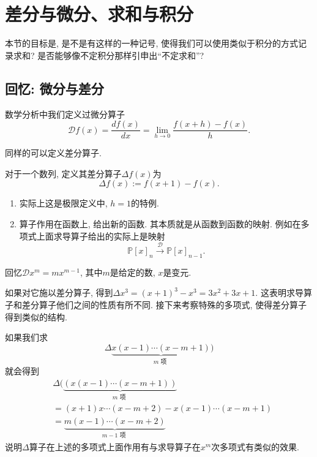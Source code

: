 \documentclass{ctexart}
\begin{document}
\newpage
\section{差分与微分、求和与积分}

本节的目标是, 是不是有这样的一种记号, 使得我们可以使用类似于积分的方式记录求和? 是否能够像不定积分那样引申出``不定求和''?

\subsection{回忆: 微分与差分} 数学分析中我们定义过微分算子
$$
	\mathscr D f(x)=\frac{d f(x)}{d x}=\lim _{h \rightarrow 0} \frac{f(x+h)-f(x)}{h} .
$$

同样的可以定义差分算子.

\begin{definition}[差分] 对于一个数列, 定义其差分算子$\Delta f(x)$为
	\[
		\Delta f(x):=f(x+1)-f(x) .
	\]
\end{definition}

\begin{remark}
	\begin{enumerate}
		\item 实际上这是极限定义中, $h=1$的特例.
		\item 算子作用在函数上, 给出新的函数. 其本质就是从函数到函数的映射. 例如在多项式上面求导算子给出的实际上是映射
		      \[
			      \mathbb P [x]_n\stackrel{\mathscr D}{\longrightarrow} \mathbb P[x]_{n-1}.
		      \]
	\end{enumerate}

\end{remark}

\begin{example}
	回忆$\mathscr D x^m=m x^{m-1}$, 其中$m$是给定的数, $x$是变元.

	如果对它施以差分算子, 得到$\Delta x^3=(x+1)^3-x^3=3 x^2+3 x+1$. 这表明求导算子和差分算子他们之间的性质有所不同.
	接下来考察特殊的多项式, 使得差分算子得到类似的结构.

\end{example}

\begin{example}[下降幂]
	如果我们求
	$$
		\Delta \underbrace{x(x-1) \cdots(x-m+1)}_{m \text { 项 }})
	$$
	就会得到
	$$
		\begin{aligned}
			 & \Delta(\underbrace{(x(x-1) \cdots(x-m+1))}_{m \text { 项 }} \\
			 & =(x+1) x \cdots(x-m+2)-x(x-1) \cdots(x-m+1)                \\
			 & =\underbrace{m(x-1) \cdots(x-m+2)}_{m-1 \text { 项 }}
		\end{aligned}
	$$
	说明$\Delta$算子在上述的多项式上面作用有与求导算子在$x^m$次多项式有类似的效果.
\end{example}
\end{document}
